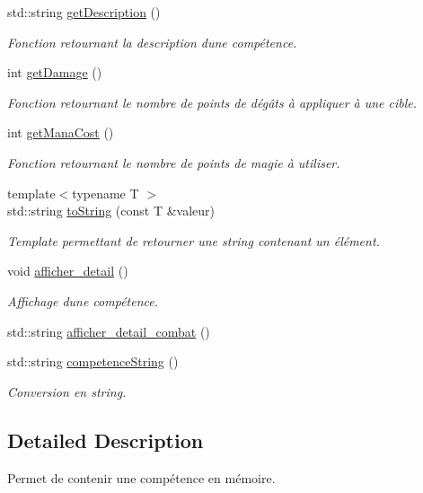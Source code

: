 \begin{DoxyCompactItemize}
std\+::string \hyperlink{classcompetence_ae0980a623fb74c32a630400cdb56cd14}{get\+Description} ()
\begin{DoxyCompactList}\small\item\em Fonction retournant la description d\textquotesingle{}une compétence. \end{DoxyCompactList}\item 
int \hyperlink{classcompetence_a752380fae93494815023b3a177e57f44}{get\+Damage} ()
\begin{DoxyCompactList}\small\item\em Fonction retournant le nombre de points de dégâts à appliquer à une cible. \end{DoxyCompactList}\item 
int \hyperlink{classcompetence_a8346c6ae95df148e42f26b9a94655c8f}{get\+Mana\+Cost} ()
\begin{DoxyCompactList}\small\item\em Fonction retournant le nombre de points de magie à utiliser. \end{DoxyCompactList}\item 
{\footnotesize template$<$typename T $>$ }\\std\+::string \hyperlink{classcompetence_adbd67d184b75c46bc22c1aef070d9246}{to\+String} (const T \&valeur)
\begin{DoxyCompactList}\small\item\em Template permettant de retourner une string contenant un élément. \end{DoxyCompactList}\item 
void \hyperlink{classcompetence_a8398d16c43f6ca6b44e3779730e022b6}{afficher\+\_\+detail} ()
\begin{DoxyCompactList}\small\item\em Affichage d\textquotesingle{}une compétence. \end{DoxyCompactList}\item 
std\+::string \hyperlink{classcompetence_a7e0e1108a22437875609defae6515f09}{afficher\+\_\+detail\+\_\+combat} ()
\item 
std\+::string \hyperlink{classcompetence_a4acc4e02f7e8c49a6d4d1db307e8f03d}{competence\+String} ()
\begin{DoxyCompactList}\small\item\em Conversion en string. \end{DoxyCompactList}\end{DoxyCompactItemize}


\subsection{Detailed Description}
Permet de contenir une compétence en mémoire.

